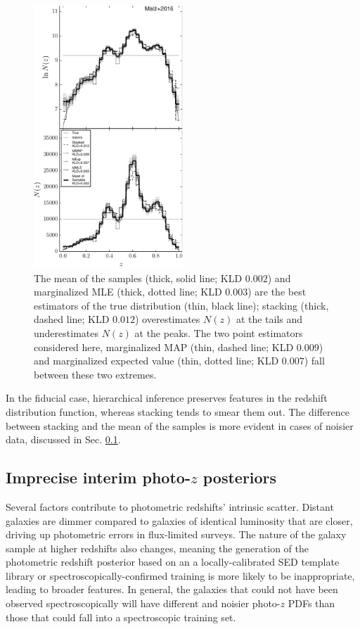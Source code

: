 \documentclass[preprint]{aastex}
\begin{document}
\begin{figure}
\includegraphics[width=0.5\textwidth]{figs/null/comps.pdf}
\caption{The mean of the samples (thick, solid line; KLD $0.002$) and 
marginalized MLE (thick, dotted line; KLD $0.003$) are the best estimators of 
the true distribution (thin, black line); stacking (thick, dashed line; KLD 
$0.012$) overestimates $N(z)$ at the tails and underestimates $N(z)$ at the 
peaks.  The two point estimators considered here, marginalized MAP (thin, 
dashed line; KLD $0.009$) and marginalized expected value (thin, dotted line; 
KLD $0.007$) fall between these two extremes.}
\label{fig:null-comp}
\end{figure}

In the fiducial case, hierarchical inference preserves features in the redshift 
distribution function, whereas stacking tends to smear them out.  The 
difference between stacking and the mean of the samples is more evident in 
cases of noisier data, discussed in Sec. \ref{sec:noisy}.

\clearpage
\subsection{Imprecise interim photo-$z$ posteriors}
\label{sec:noisy}

Several factors contribute to photometric redshifts' intrinsic scatter.  
Distant galaxies are dimmer compared to galaxies of identical luminosity that 
are closer, driving up photometric errors in flux-limited surveys.  The nature 
of the galaxy sample at higher redshifts also changes, meaning the generation 
of the photometric redshift posterior based on an a locally-calibrated SED 
template library or spectroscopically-confirmed training is more likely to be 
inappropriate, leading to broader features.  In general, the galaxies that 
could not have been observed spectroscopically will have different and noisier 
photo-$z$ PDFs than those that could fall into a spectroscopic training set.
\end{document}
